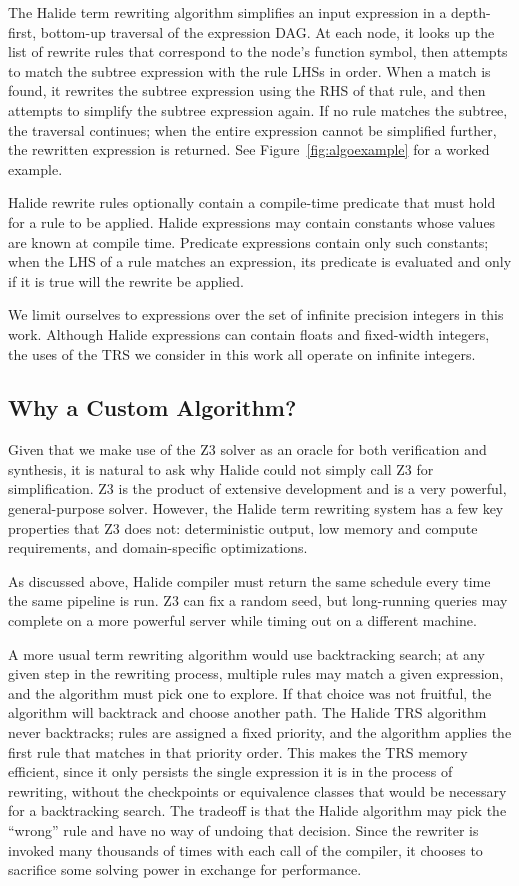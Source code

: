 \documentclass[acmsmall,review,anonymous]{acmart}\settopmatter{printfolios=true,printccs=false,printacmref=false}
\begin{document}
The Halide term rewriting algorithm simplifies an input expression in a
depth-first, bottom-up traversal of the expression DAG. At each node, it looks
up the list of rewrite rules that correspond to the node's function symbol, then
attempts to match the subtree expression with the rule LHSs in order. When a
match is found, it rewrites the subtree expression using the RHS of that rule,
and then attempts to simplify the subtree expression again. If no rule matches
the subtree, the traversal continues; when the entire expression cannot be
simplified further, the rewritten expression is returned. See Figure~\ref{fig:algoexample} for a worked example. 

Halide rewrite rules optionally contain a compile-time predicate that must hold for a rule to
be applied. Halide expressions may contain constants whose values are known at
compile time. Predicate expressions contain only such constants; when the
LHS of a rule matches an expression, its predicate is evaluated and only if it
is true will the rewrite be applied.

We limit ourselves to expressions over the set of infinite precision integers in
this work. Although Halide expressions can contain floats and fixed-width
integers, the uses of the TRS we consider in this work all operate
on infinite integers.

\subsection{Why a Custom Algorithm?}

Given that we make use of the Z3 solver as an oracle for both verification and synthesis, it is natural to ask why Halide could not simply call Z3 for simplification. Z3 is the product of extensive development and is a very powerful, general-purpose solver. However, the Halide term rewriting system has a few key properties that Z3 does not: deterministic output, low memory and compute requirements, and domain-specific optimizations.

As discussed above, Halide compiler must return the same schedule every time the same pipeline is run. Z3 can fix a random seed, but long-running queries may complete on a more powerful server while timing out on a different machine.

A more usual term rewriting algorithm would use backtracking search; at any given step in the rewriting process, multiple rules may match a given expression, and the algorithm must pick one to explore. If that choice was not fruitful, the algorithm will backtrack and choose another path. The Halide TRS algorithm never backtracks; rules are assigned a fixed priority, and the algorithm applies the first rule that matches in that priority order. This makes the TRS memory efficient, since it only persists the single expression it is in the process of rewriting, without the checkpoints or equivalence classes that would be necessary for a backtracking search. The tradeoff is that the Halide algorithm may pick the ``wrong'' rule and have no way of undoing that decision. Since the rewriter is invoked many thousands of times with each call of the compiler, it chooses to sacrifice some solving power in exchange for performance. 
\end{document}
